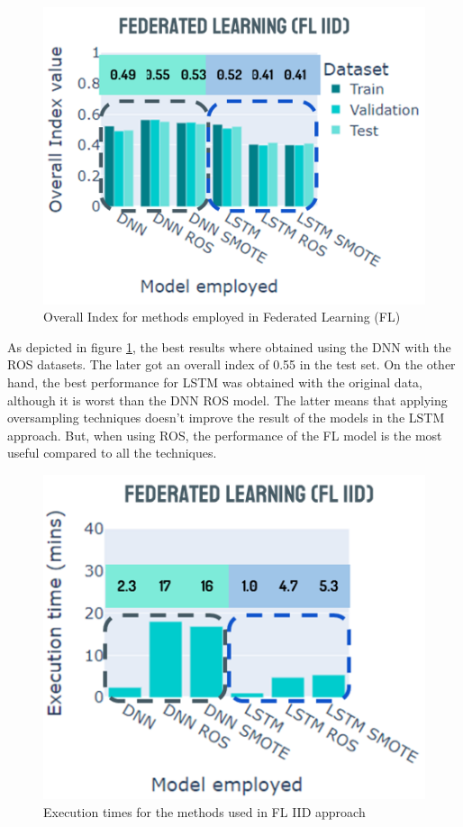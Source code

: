 \begin{figure}[H]
\centering
\includegraphics[scale=0.6]{img/fl_iid_methods.png}
\caption{Overall Index for methods employed in Federated Learning (FL)}
\label{fig:fl_iid_methods}
\end{figure}

As depicted in figure \ref{fig:fl_iid_methods}, the best results where obtained using the DNN with the ROS datasets. The later got an overall index of 0.55 in the test set. On the other hand, the best performance for LSTM was obtained with the original data, although it is worst than the DNN ROS model. The latter means that applying oversampling techniques doesn't improve the result of the models in the LSTM approach. But, when using ROS, the performance of the FL model is the most useful compared to all the techniques.

\begin{figure}[H]
\centering
\includegraphics[scale=0.6]{img/times_fl_iid.png}
\caption{Execution times for the methods used in FL IID approach}
\label{fig:times_fl_iid}
\end{figure}

